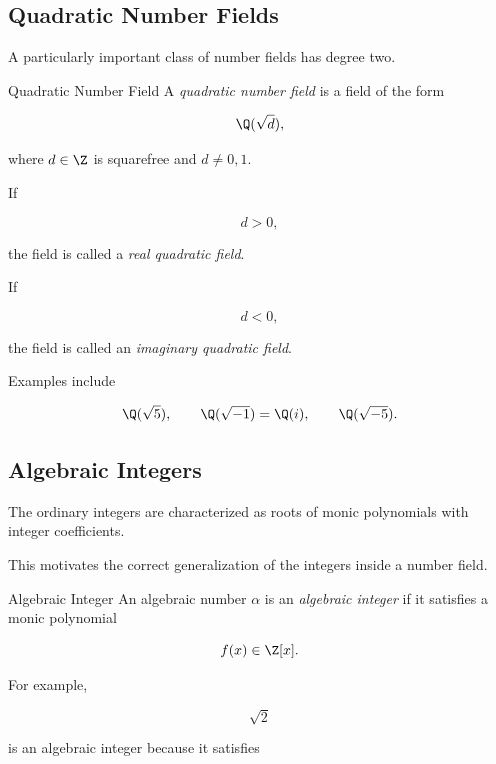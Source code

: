 \subsection{Quadratic Number Fields}
\label{subsec:quadratic-number-fields}

A particularly important class of number fields has degree two.

\begin{definitionbox}{Quadratic Number Field}
A \emph{quadratic number field} is a field of the form

\[ \Q(\sqrt d), \]

where \(d\in\Z\) is squarefree and \(d\neq0,1\).
\end{definitionbox}

If

\[ d>0, \]

the field is called a \emph{real quadratic field}.

If

\[ d<0, \]

the field is called an \emph{imaginary quadratic field}.

Examples include

\[ \Q(\sqrt5),\qquad\Q(\sqrt{-1})=\Q(i),\qquad\Q(\sqrt{-5}). \]

\subsection{Algebraic Integers}
\label{subsec:algebraic-integers}

The ordinary integers are characterized as roots of monic polynomials with
integer coefficients.

This motivates the correct generalization of the integers inside a number
field.

\begin{definitionbox}{Algebraic Integer}
An algebraic number \(\alpha\) is an \emph{algebraic integer} if it satisfies
a monic polynomial

\[ f(x)\in\Z[x]. \]
\end{definitionbox}

For example,

\[ \sqrt2 \]

is an algebraic integer because it satisfies

